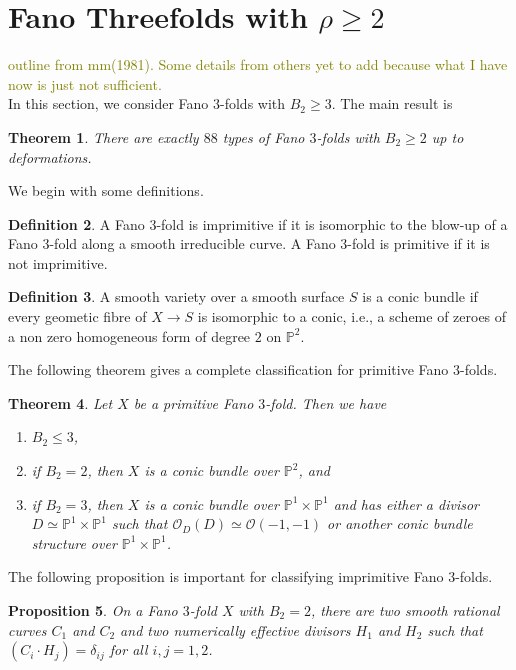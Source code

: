 \documentclass[12pt]{amsart}
\theoremstyle{plain}
\newtheorem{theorem}{Theorem}[section]
\newtheorem{proposition}[theorem]{Proposition}
\theoremstyle{definition}
\newtheorem{definition}[theorem]{Definition}
\theoremstyle{expl}
\begin{document}
{\section{Fano Threefolds with $\rho \geq 2$}
	\textcolor{olive}{outline from mm(1981). Some details from others yet to add because what I have now is just not sufficient.}\\ 
	In this section, we consider Fano $3$-folds with $B_2 \geq 3$. The main result is 
	\begin{theorem}
	There are exactly $88$ types of Fano $3$-folds with $B_2 \geq 2$ up to deformations.
	\end{theorem}
	We begin with some definitions. 
	\begin{definition}
		A Fano $3$-fold is imprimitive if it is isomorphic to the blow-up of a Fano $3$-fold along a smooth irreducible curve. A Fano $3$-fold is primitive if it is not imprimitive.
	\end{definition}
    \begin{definition}
    	A smooth variety over a smooth surface $S$ is a conic bundle if every geometic fibre of $X \to S$ is isomorphic to a conic, i.e., a scheme of zeroes of a non zero homogeneous form of degree $2$ on $\mathbb{P}^2$.
    \end{definition}
    \noindent The following theorem gives a complete classification for primitive Fano $3$-folds.
    \begin{theorem}
    	Let $X$ be a primitive Fano $3$-fold. Then we have 
    	\begin{enumerate}
    		\item $B_2 \leq 3$,
		\item if $B_2 =2$, then $X$ is a conic bundle over $\mathbb{P}^2$, and
    		\item if $B_2 =3$, then $X$ is a conic bundle over $\mathbb{P}^1 \times \mathbb{P}^1$ and has either a divisor $D \simeq \mathbb{P}^1 \times \mathbb{P}^1$ such that $\mathcal{O}_D(D) \simeq \mathcal{O}(-1,-1)$ or another conic bundle structure over $\mathbb{P}^1 \times \mathbb{P}^1$.
    	\end{enumerate}
    \end{theorem}
      \noindent The following proposition is important for classifying imprimitive Fano $3$-folds.
    \begin{proposition}
    	On a Fano $3$-fold $X$ with $B_2 =2$, there are two smooth rational curves $C_1$ and $C_2$ and two numerically effective divisors $H_1$ and $H_2$ such that $(C_i \cdot H_j)= \delta_{ij}$ for all $i,j=1,2$. 

\end{proposition}}
\end{document}
